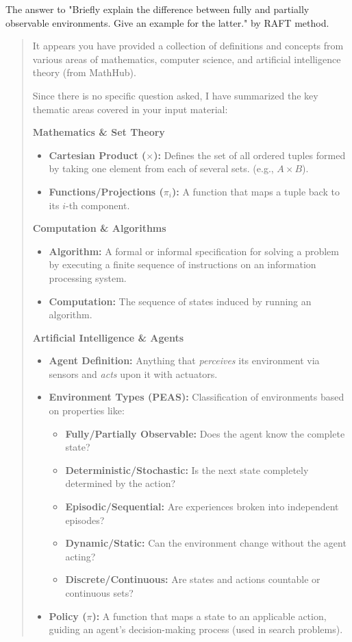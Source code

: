 The answer to "Briefly explain the difference between fully and partially observable environments. Give an example for the latter." by RAFT method.
\begin{quote}
    \label{appendix:raft_environments}
    It appears you have provided a collection of definitions and concepts from various areas of mathematics, computer science, and artificial intelligence theory (from MathHub).

Since there is no specific question asked, I have summarized the key thematic areas covered in your input material:

\medskip

\noindent\textbf{Mathematics \& Set Theory}
\begin{itemize}
    \item \textbf{Cartesian Product ($\times$):} Defines the set of all ordered tuples formed by taking one element from each of several sets. (e.g., $A \times B$).
    \item \textbf{Functions/Projections ($\pi_i$):} A function that maps a tuple back to its $i$-th component.
\end{itemize}

\medskip

\noindent\textbf{Computation \& Algorithms}
\begin{itemize}
    \item \textbf{Algorithm:} A formal or informal specification for solving a problem by executing a finite sequence of instructions on an information processing system.
    \item \textbf{Computation:} The sequence of states induced by running an algorithm.
\end{itemize}

\medskip

\noindent\textbf{Artificial Intelligence \& Agents}
\begin{itemize}
    \item \textbf{Agent Definition:} Anything that \emph{perceives} its environment via sensors and \emph{acts} upon it with actuators.
    \item \textbf{Environment Types (PEAS):} Classification of environments based on properties like:
    \begin{itemize}
        \item \textbf{Fully/Partially Observable:} Does the agent know the complete state?
        \item \textbf{Deterministic/Stochastic:} Is the next state completely determined by the action?
        \item \textbf{Episodic/Sequential:} Are experiences broken into independent episodes?
        \item \textbf{Dynamic/Static:} Can the environment change without the agent acting?
        \item \textbf{Discrete/Continuous:} Are states and actions countable or continuous sets?
    \end{itemize}
    \item \textbf{Policy ($\pi$):} A function that maps a state to an applicable action, guiding an agent's decision-making process (used in search problems).
\end{itemize}


\end{quote}
